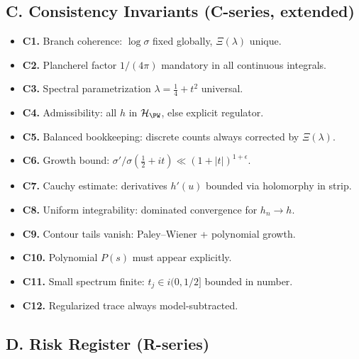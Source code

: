 
\subsection*{C. Consistency Invariants (C-series, extended)}
\label{subsec:invariants-final}

\begin{itemize}
  \item \textbf{C1.} Branch coherence: $\log\sigma$ fixed globally, $\Xi(\lambda)$ unique.
  \item \textbf{C2.} Plancherel factor $1/(4\pi)$ mandatory in all continuous integrals.
  \item \textbf{C3.} Spectral parametrization $\lambda=\tfrac14+t^2$ universal.
  \item \textbf{C4.} Admissibility: all $h$ in $\mathcal H_{\PW}$, else explicit regulator.
  \item \textbf{C5.} Balanced bookkeeping: discrete counts always corrected by $\Xi(\lambda)$.
  \item \textbf{C6.} Growth bound: $\sigma'/\sigma(\tfrac12+it)\ll (1+|t|)^{1+\epsilon}$.
  \item \textbf{C7.} Cauchy estimate: derivatives $h'(u)$ bounded via holomorphy in strip.
  \item \textbf{C8.} Uniform integrability: dominated convergence for $h_n\to h$.
  \item \textbf{C9.} Contour tails vanish: Paley–Wiener + polynomial growth.
  \item \textbf{C10.} Polynomial $P(s)$ must appear explicitly.
  \item \textbf{C11.} Small spectrum finite: $t_j\in i(0,1/2]$ bounded in number.
  \item \textbf{C12.} Regularized trace always model-subtracted.
\end{itemize}


\subsection*{D. Risk Register (R-series)}
\label{subsec:risks-final}


